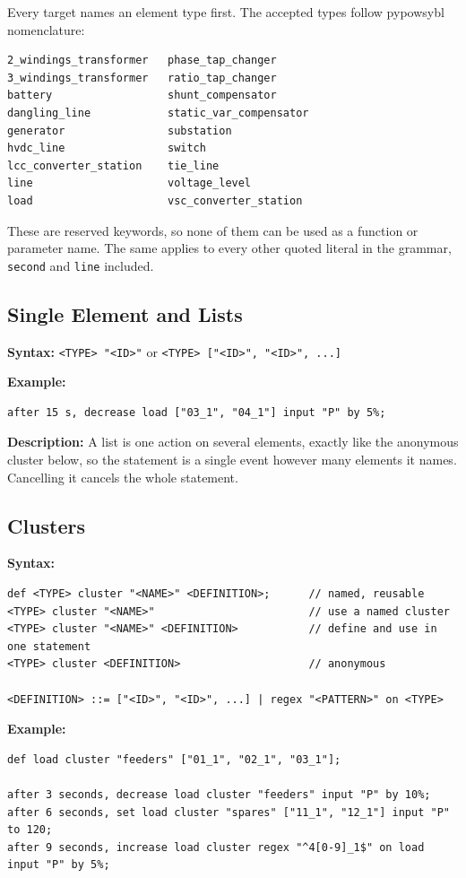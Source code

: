 \documentclass[12pt]{article}
\begin{document}
Every target names an element type first. The accepted types follow pypowsybl nomenclature:

\begin{lstlisting}
2_windings_transformer   phase_tap_changer
3_windings_transformer   ratio_tap_changer
battery                  shunt_compensator
dangling_line            static_var_compensator
generator                substation
hvdc_line                switch
lcc_converter_station    tie_line
line                     voltage_level
load                     vsc_converter_station
\end{lstlisting}

These are reserved keywords, so none of them can be used as a function or parameter name. The same applies to every other quoted literal in the grammar, \texttt{second} and \texttt{line} included.

\subsection{Single Element and Lists}

\textbf{Syntax:} \texttt{<TYPE> "<ID>"} \quad or \quad \texttt{<TYPE> ["<ID>", "<ID>", ...]}

\textbf{Example:}
\begin{lstlisting}
after 15 s, decrease load ["03_1", "04_1"] input "P" by 5%;
\end{lstlisting}

\textbf{Description:} A list is one action on several elements, exactly like the anonymous cluster below, so the statement is a single event however many elements it names. Cancelling it cancels the whole statement.

\subsection{Clusters}

\textbf{Syntax:}
\begin{lstlisting}
def <TYPE> cluster "<NAME>" <DEFINITION>;      // named, reusable
<TYPE> cluster "<NAME>"                        // use a named cluster
<TYPE> cluster "<NAME>" <DEFINITION>           // define and use in one statement
<TYPE> cluster <DEFINITION>                    // anonymous

<DEFINITION> ::= ["<ID>", "<ID>", ...] | regex "<PATTERN>" on <TYPE>
\end{lstlisting}

\textbf{Example:}
\begin{lstlisting}
def load cluster "feeders" ["01_1", "02_1", "03_1"];

after 3 seconds, decrease load cluster "feeders" input "P" by 10%;
after 6 seconds, set load cluster "spares" ["11_1", "12_1"] input "P" to 120;
after 9 seconds, increase load cluster regex "^4[0-9]_1$" on load input "P" by 5%;
\end{lstlisting}
\end{document}
